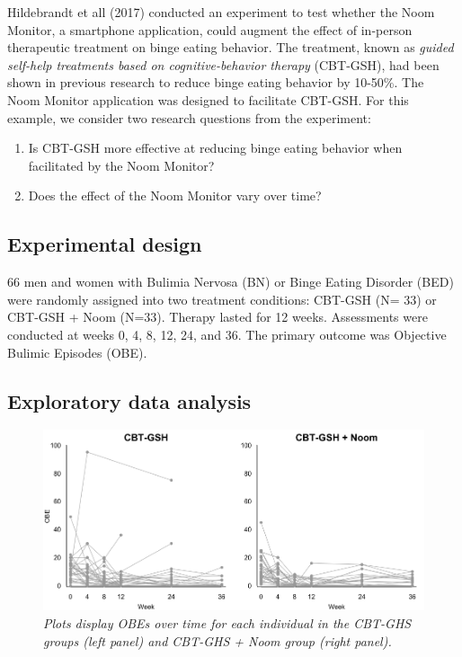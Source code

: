 \documentclass[12pt, oneside]{article}
\begin{document}
Hildebrandt et all (2017) conducted an experiment to test whether the Noom Monitor, a smartphone application, could augment the effect of in-person therapeutic treatment on binge eating behavior.  The treatment, known as \emph{guided self-help treatments based on cognitive-behavior therapy} (CBT-GSH), had been shown in previous research to reduce binge eating behavior by 10-50\%.  The Noom Monitor application was designed to facilitate CBT-GSH.  For this example, we consider two research questions from the experiment:
\begin{enumerate}
\item{Is CBT-GSH more effective at reducing binge eating behavior when facilitated by the Noom Monitor?}
\item{Does the effect of the Noom Monitor vary over time?}
\end{enumerate}

\subsection{Experimental design}

66 men and women with Bulimia Nervosa (BN) or Binge Eating Disorder (BED) were randomly assigned into two treatment conditions: CBT-GSH (N= 33) or CBT-GSH + Noom (N=33).  Therapy lasted for 12 weeks.  Assessments were conducted at weeks 0, 4, 8, 12, 24, and 36.  The primary outcome was Objective Bulimic Episodes (OBE).  

\subsection{Exploratory data analysis}

\begin{figure}
\centering
\includegraphics[width=\textwidth, height=\textheight, keepaspectratio]{Noom_paths.png}
\caption{\emph{Plots display OBEs over time for each individual in the CBT-GHS groups (left panel) and CBT-GHS + Noom group (right panel).}}
\end{figure}
\end{document}
